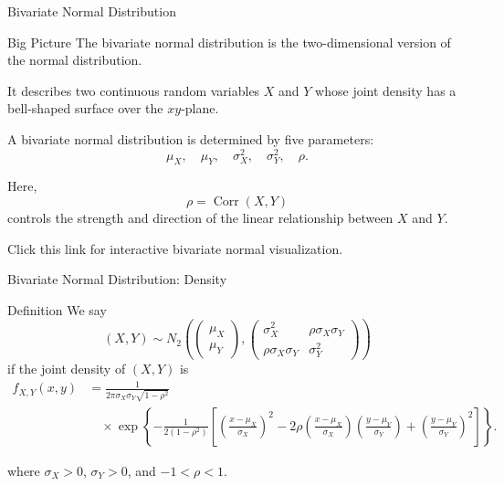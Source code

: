 \begin{frame}{Bivariate Normal Distribution}

\begin{keybox}{Big Picture}
The bivariate normal distribution is the two-dimensional version of the normal distribution.

It describes two continuous random variables $X$ and $Y$ whose joint density has a bell-shaped surface over the $xy$-plane.
\end{keybox}

\vspace{0.25cm}

A bivariate normal distribution is determined by five parameters:
\[
\mu_X,\quad \mu_Y,\quad \sigma_X^2,\quad \sigma_Y^2,\quad \rho.
\]

Here,
\[
\rho=\operatorname{Corr}(X,Y)
\]
controls the strength and direction of the linear relationship between $X$ and $Y$.

\vspace{0.3cm}

\centering
\href{https://armanjg.github.io/MATH-394-Probability-1-v2/Figures/bivariate.html}{}
Click this link for interactive bivariate normal visualization.

\end{frame}




\begin{frame}{Bivariate Normal Distribution: Density}

\begin{keybox}{Definition}
We say
\[
(X,Y)
\sim
N_2
\left(
\begin{pmatrix}
\mu_X\\
\mu_Y
\end{pmatrix},
\begin{pmatrix}
\sigma_X^2 & \rho\sigma_X\sigma_Y\\
\rho\sigma_X\sigma_Y & \sigma_Y^2
\end{pmatrix}
\right)
\]
if the joint density of $(X,Y)$ is
\[
\begin{aligned}
f_{X,Y}(x,y)
&=
\frac{1}{2\pi \sigma_X\sigma_Y\sqrt{1-\rho^2}}
\\[0.15cm]
&\quad \times
\exp\left\{
-\frac{1}{2(1-\rho^2)}
\left[
\left(\frac{x-\mu_X}{\sigma_X}\right)^2
-2\rho
\left(\frac{x-\mu_X}{\sigma_X}\right)
\left(\frac{y-\mu_Y}{\sigma_Y}\right)
+
\left(\frac{y-\mu_Y}{\sigma_Y}\right)^2
\right]
\right\}.
\end{aligned}
\]
\end{keybox}

where $\sigma_X>0$, $\sigma_Y>0$, and $-1<\rho<1$.

\end{frame}



